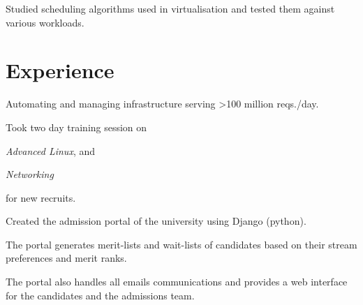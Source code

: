 \documentclass[]{deedy}
\begin{document}
\begin{minipage}[t]{0.66\textwidth}
\begin{tightemize}
\item Studied scheduling algorithms used in virtualisation and tested them against various workloads.
\end{tightemize}

\section{Experience}
\begin{tightemize}
\item Automating and managing infrastructure serving >100 million reqs./day.
\item Took two day training session on 
\begin{enumerate*}[label=(\roman*)]
  \item \textit{Advanced Linux}, and
  \item \textit{Networking}
\end{enumerate*}
 for new recruits.
\end{tightemize}
\sectionsep

\begin{tightemize}
\item Created the admission portal of the university using Django (python).
\item The portal generates merit-lists and wait-lists of candidates based on their stream preferences and merit ranks. 
\item The portal also handles all emails communications and provides a web interface for the candidates and the admissions team.
\end{tightemize}
\sectionsep



\end{minipage}
\end{document}
